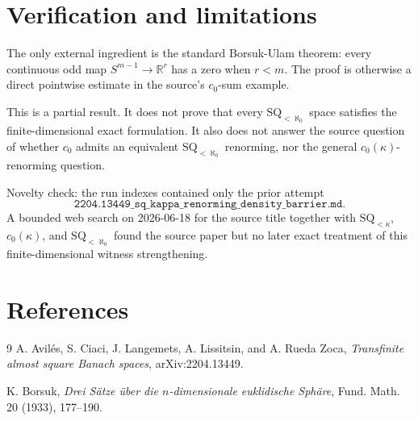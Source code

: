 \documentclass[11pt]{article}
\newcommand{\R}{\mathbb{R}}
\begin{document}
\section*{Verification and limitations}

The only external ingredient is the standard Borsuk-Ulam theorem: every
continuous odd map \(S^{m-1}\to\R^r\) has a zero when \(r<m\).  The proof is
otherwise a direct pointwise estimate in the source's \(c_0\)-sum example.

This is a partial result.  It does not prove that every
\(\mathrm{SQ}_{<\aleph_0}\) space satisfies the finite-dimensional exact
formulation.  It also does not answer the source question of whether \(c_0\)
admits an equivalent \(\mathrm{SQ}_{<\aleph_0}\) renorming, nor the general
\(c_0(\kappa)\)-renorming question.

Novelty check: the run indexes contained only the prior attempt
\[
\texttt{2204.13449\_sq\_kappa\_renorming\_density\_barrier.md}.
\]
A bounded web
search on 2026-06-18 for the source title together with
\(\mathrm{SQ}_{<\kappa}\), \(c_0(\kappa)\), and \(\mathrm{SQ}_{<\aleph_0}\)
found the source paper but no later exact treatment of this finite-dimensional
witness strengthening.

\section*{References}

\begin{thebibliography}{9}
A. Avilés, S. Ciaci, J. Langemets, A. Lissitsin, and A. Rueda Zoca,
\emph{Transfinite almost square Banach spaces}, arXiv:2204.13449.

K. Borsuk,
\emph{Drei Sätze über die \(n\)-dimensionale euklidische Sphäre},
Fund. Math. 20 (1933), 177--190.
\end{thebibliography}
\end{document}
